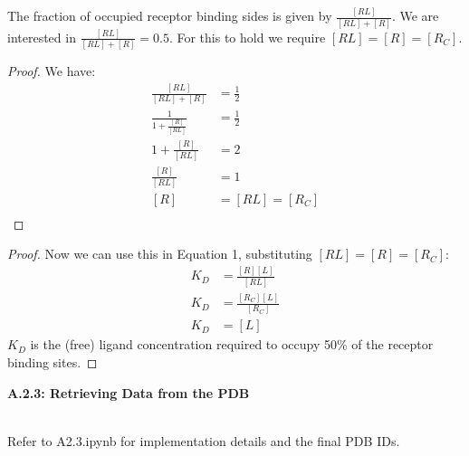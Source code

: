 \documentclass[a4paper,10pt]{article}
\begin{document}
The fraction of occupied receptor binding sides is given by $\frac{[RL]}{[RL]+ [R]}$. We are interested in $\frac{[RL]}{[RL]+ [R]} = 0.5$. For this to hold we require $[RL] = [R] = [R_C]$.
\begin{proof}
We have:
\begin{align*}
\frac{[RL]}{[RL]+ [R]} &= \frac{1}{2} \\
         \frac{1}{1 +\frac{[R]}{[RL]}} &= \frac{1}{2}  \\
         1 +\frac{[R]}{[RL]} &= 2  \\
         \frac{[R]}{[RL]} &= 1  \\
         [R] &= [RL]  = [R_C]\\
\end{align*}
\end{proof}
\begin{proof}
Now we can use this in Equation 1, substituting $[RL] = [R] = [R_C]$:
\begin{align*}
K_D& = \frac{[R][L]}{[RL]} \\
K_D &= \frac{[R_C][L]}{[R_C]} \\
         K_D &= [L]
\end{align*}
$K_D$ is the (free) ligand concentration required to occupy 50\% of the receptor binding sites.
\end{proof}


\begin{large}
	\vspace{1.0cm}
	\textbf{A.2.3: Retrieving Data from the PDB}
\end{large}	\\ [2mm]


Refer to A2.3.ipynb for implementation details and the final PDB IDs.



\end{document}
